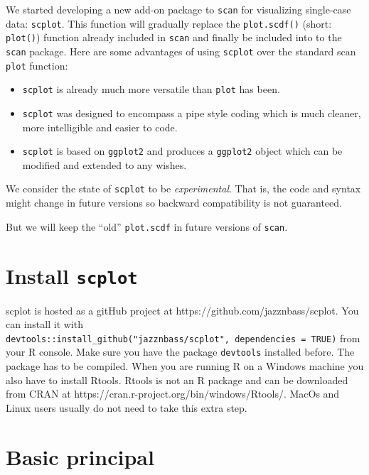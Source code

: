 \documentclass[
  letterpaper,
  DIV=11,
  numbers=noendperiod]{scrreprt}
\providecommand{\tightlist}{%
  \setlength{\itemsep}{0pt}\setlength{\parskip}{0pt}}\usepackage{longtable,booktabs,array}
\begin{document}
We started developing a new add-on package to \texttt{scan} for
visualizing single-case data: \texttt{scplot}. This function will
gradually replace the \texttt{plot.scdf()} (short: \texttt{plot()})
function already included in \texttt{scan} and finally be included into
to the \texttt{scan} package. Here are some advantages of using
\texttt{scplot} over the standard scan \texttt{plot} function:

\begin{itemize}
\tightlist
\item
  \texttt{scplot} is already much more versatile than \texttt{plot} has
  been.
\item
  \texttt{scplot} was designed to encompass a pipe style coding which is
  much cleaner, more intelligible and easier to code.
\item
  \texttt{scplot} is based on \texttt{ggplot2} and produces a
  \texttt{ggplot2} object which can be modified and extended to any
  wishes.
\end{itemize}

We consider the state of \texttt{scplot} to be \emph{experimental}. That
is, the code and syntax might change in future versions so backward
compatibility is not guaranteed.

But we will keep the ``old'' \texttt{plot.scdf} in future versions of
\texttt{scan}.

\hypertarget{install-scplot}{%
\section{\texorpdfstring{Install
\texttt{scplot}}{Install scplot}}\label{install-scplot}}

scplot is hosted as a gitHub project at
https://github.com/jazznbass/scplot. You can install it with
\texttt{devtools::install\_github("jazznbass/scplot",\ dependencies\ =\ TRUE)}
from your R console. Make sure you have the package \texttt{devtools}
installed before. The package has to be compiled. When you are running R
on a Windows machine you also have to install Rtools. Rtools is not an R
package and can be downloaded from CRAN at
https://cran.r-project.org/bin/windows/Rtools/. MacOs and Linux users
usually do not need to take this extra step.

\hypertarget{basic-principal}{%
\section{Basic principal}\label{basic-principal}}
\end{document}
